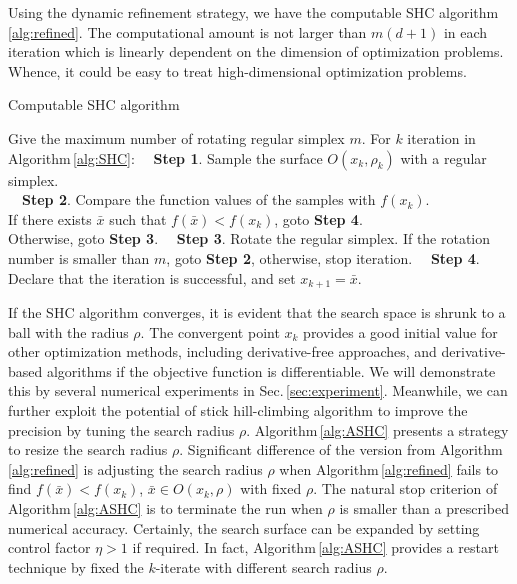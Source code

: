 \documentclass[preprint,12pt]{elsarticle}
\begin{document}
Using the dynamic refinement strategy, we have the computable SHC
algorithm \ref{alg:refined}. The computational amount is not
larger than $m(d+1)$ in each iteration which is linearly
dependent on the dimension of optimization problems. 
Whence, it could be easy to treat high-dimensional optimization
problems.
\begin{algorithm}[]
	\caption{Computable SHC algorithm} 
	\label{alg:refined}
\begin{algorithmic}[]
	\STATE Give the maximum number of rotating regular simplex $m$.
	\STATE For $k$ iteration in Algorithm\,\ref{alg:SHC}:
	\STATE ~~\textbf{Step 1}. Sample the surface
	$O(x_k, \rho_k)$ with a regular simplex. \\
	\STATE ~~\textbf{Step 2}. Compare the function values of the
	samples with $f(x_k)$.
	\\
	\hspace{1.5cm} If there exists $\bar{x}$ such that
	$f(\bar{x})<f(x_k)$, goto \textbf{Step 4}.
	\\
	\hspace{1.5cm} Otherwise, goto \textbf{Step 3}.
	\STATE ~~\textbf{Step 3}. Rotate the regular simplex. If the
	rotation number is smaller than $m$, goto \textbf{Step 2},
	otherwise, stop iteration.
	\STATE ~~\textbf{Step 4}. Declare that the iteration is
	successful, and set $x_{k+1}= \bar{x}$.
\end{algorithmic}
\end{algorithm}

If the SHC algorithm converges, it is evident that
the search space is shrunk to a ball with the radius $\rho$. 
The convergent point $x_k$ provides a good initial value for
other optimization methods, including derivative-free
approaches, and derivative-based algorithms if the objective
function is differentiable. 
We will demonstrate this by several numerical experiments in
Sec.\,\ref{sec:experiment}.
Meanwhile, we can further exploit the potential of
stick hill-climbing algorithm to improve the precision by tuning the
search radius $\rho$. Algorithm\,\ref{alg:ASHC} presents a
strategy to resize the search radius $\rho$. 
Significant difference of the version from
Algorithm\,\ref{alg:refined} is adjusting the search radius
$\rho$ when Algorithm\,\ref{alg:refined} fails to find
$f(\bar{x})<f(x_k)$, $\bar{x}\in O(x_k, \rho)$ with
fixed $\rho$. 
The natural stop criterion of Algorithm\,\ref{alg:ASHC} is to
terminate the run when $\rho$ is smaller than a prescribed
numerical accuracy.
Certainly, the search surface can be expanded by setting
control factor $\eta>1$ if required. 
In fact, Algorithm\,\ref{alg:ASHC} provides a restart technique by
fixed the $k$-iterate with different search radius $\rho$.
\end{document}
